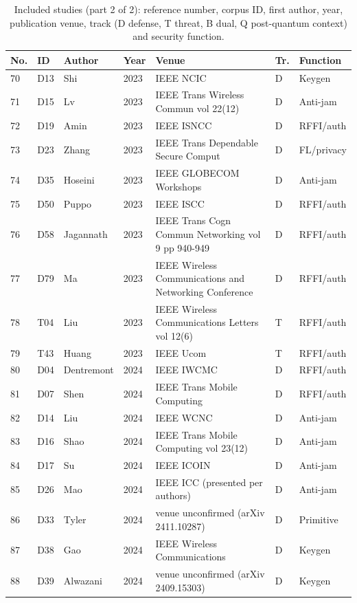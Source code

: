 \documentclass[10.5pt,compsoc,winfonts]{ICN}
\begin{document}
\begin{table}[p]
\centering
\scriptsize
\setlength{\tabcolsep}{2.5pt}
\caption{Included studies (part 2 of 2): reference number, corpus ID, first author, year, publication venue, track (D defense, T threat, B dual, Q post-quantum context) and security function.}
\label{tab:corpusb}
\begin{tabular}{@{}lllll>{\raggedright\arraybackslash}p{3.3cm}>{\raggedright\arraybackslash}p{1.9cm}@{}}
\toprule
No. & ID & Author & Year & Venue & Tr. & Function \\
\midrule
70 & D13 & Shi & 2023 & IEEE NCIC & D & Keygen \\
71 & D15 & Lv & 2023 & IEEE Trans Wireless Commun vol 22(12) & D & Anti-jam \\
72 & D19 & Amin & 2023 & IEEE ISNCC & D & RFFI/auth \\
73 & D23 & Zhang & 2023 & IEEE Trans Dependable Secure Comput & D & FL/privacy \\
74 & D35 & Hoseini & 2023 & IEEE GLOBECOM Workshops & D & Anti-jam \\
75 & D50 & Puppo & 2023 & IEEE ISCC & D & RFFI/auth \\
76 & D58 & Jagannath & 2023 & IEEE Trans Cogn Commun Networking vol 9 pp 940-949 & D & RFFI/auth \\
77 & D79 & Ma & 2023 & IEEE Wireless Communications and Networking Conference & D & RFFI/auth \\
78 & T04 & Liu & 2023 & IEEE Wireless Communications Letters vol 12(6) & T & RFFI/auth \\
79 & T43 & Huang & 2023 & IEEE Ucom & T & RFFI/auth \\
80 & D04 & Dentremont & 2024 & IEEE IWCMC & D & RFFI/auth \\
81 & D07 & Shen & 2024 & IEEE Trans Mobile Computing & D & RFFI/auth \\
82 & D14 & Liu & 2024 & IEEE WCNC & D & Anti-jam \\
83 & D16 & Shao & 2024 & IEEE Trans Mobile Computing vol 23(12) & D & Anti-jam \\
84 & D17 & Su & 2024 & IEEE ICOIN & D & Anti-jam \\
85 & D26 & Mao & 2024 & IEEE ICC (presented per authors) & D & Anti-jam \\
86 & D33 & Tyler & 2024 & venue unconfirmed (arXiv 2411.10287) & D & Primitive \\
87 & D38 & Gao & 2024 & IEEE Wireless Communications & D & Keygen \\
88 & D39 & Alwazani & 2024 & venue unconfirmed (arXiv 2409.15303) & D & Keygen \\

\end{tabular}
\end{table}
\end{document}
